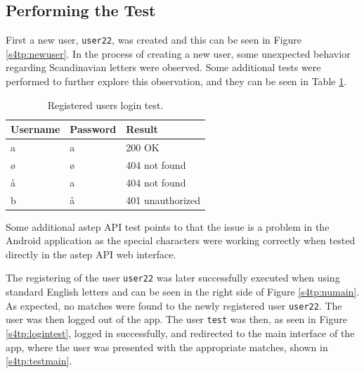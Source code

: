 \subsection{Performing the Test}
First a new user, \texttt{user22}, was created and this can be seen in Figure \ref{s4tp:newuser}.
In the process of creating a new user, some unexpected behavior regarding Scandinavian letters were observed.
Some additional tests were performed to further explore this observation, and they can be seen in Table \ref{tab:logintest}.
\begin{table}[!ht]
	\centering
	\begin{tabular}{@{}lll@{}}
		Username & Password & Result \\
		\hline
		a & a & 200 OK\\
		ø & ø & 404 not found\\
		å & a & 404 not found\\
		b & å & 401 unauthorized\\
	\end{tabular}
	\caption{Registered users login test.}
	\label{tab:logintest}
\end{table}

Some additional \gls{astep} API test points to that the issue is a problem in the Android application as the special characters were working correctly when tested directly in the \gls{astep} API web interface.

The registering of the user \texttt{user22} was later successfully executed when using standard English letters and can be seen in the right side of Figure \ref{s4tp:numain}. 
As expected, no matches were found to the newly registered user \texttt{user22}. 
The user was then logged out of the app.
The user \texttt{test} was then, as seen in Figure \ref{s4tp:logintest}, logged in successfully, and redirected to the main interface of the app, where the user was presented with the appropriate matches, shown in \ref{s4tp:testmain}.

